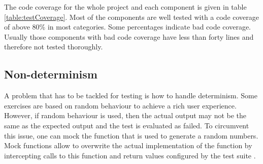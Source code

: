The code coverage for the whole project and each component is given in table \ref{table:testCoverage}. Most of the components are well tested with a code coverage of above 80\% in most categories. Some percentages indicate bad code coverage. Usually those components with bad code coverage have less than forty lines and therefore not tested thoroughly. 
 
\subsection*{Non-determinism}
A problem that has to be tackled for testing is how to handle determinism. Some exercises are based on random behaviour to achieve a rich user experience. However, if random behaviour is used, then the actual output may not be the same as the expected output and the test is evaluated as failed. To circumvent this issue, one can mock the function that is used to generate a random numbers. Mock functions allow to overwrite the actual implementation of the function by intercepting calls to this function and return values configured by the test suite \cite{Jest}. 

